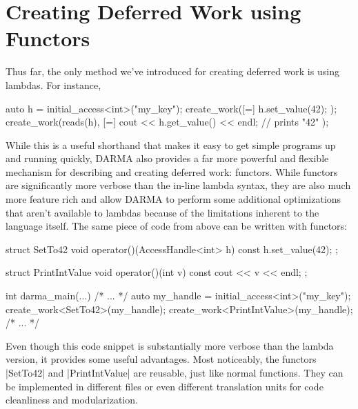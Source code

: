 
\section{Creating Deferred Work using Functors}
\label{sec:functor}

\lstMakeShortInline[style=CppCodeInlineStyle]{\|}

Thus far, the only method we've introduced for creating \gls{deferred work} is using
\CC{} \glspl{lambda}.  For instance,
\begin{CppCodeNumb}
auto h = initial_access<int>("my_key");
create_work([=]{ h.set_value(42); });
create_work(reads(h), [=]{ 
  cout << h.get_value() << endl; // prints "42"
});
\end{CppCodeNumb}
While this is a useful shorthand that makes it easy to get simple programs up
and running quickly, \gls{DARMA} also provides a far more powerful and flexible
mechanism for describing and creating \gls{deferred work}:  functors.  While functors
are significantly more verbose than the in-line \gls{lambda} syntax, they are also
much more feature rich and allow \gls{DARMA} to perform some additional optimizations
that aren't available to \glspl{lambda} because of the limitations inherent to
the \CC{} language itself.  The same piece of code from above can be written with
functors:
\begin{CppCodeNumb}
struct SetTo42 {
  void operator()(AccessHandle<int> h) const {
    h.set_value(42);
  }
};

struct PrintIntValue {
  void operator()(int v) const {
    cout << v << endl;
  }
};

int darma_main(...) {
  /* ... */
  auto my_handle = initial_access<int>("my_key");
  create_work<SetTo42>(my_handle);
  create_work<PrintIntValue>(my_handle);
  /* ... */
}
\end{CppCodeNumb}
Even though this code snippet is substantially more verbose than the
\gls{lambda} version, it provides some useful advantages.  Most noticeably, the functors
|SetTo42| and |PrintIntValue| are reusable, just like normal functions.  They
can be implemented in different files or even different translation units for
code cleanliness and modularization.  

